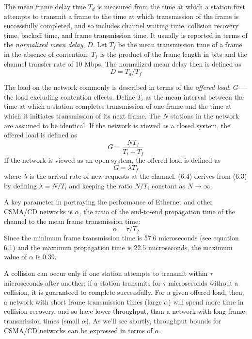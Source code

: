 The mean frame delay time $T_d$ is measured from the time at which a station first attempts to transmit a frame to the time at which transmission of the frame is successfully completed, and so includes channel waiting time, collision recovery time, backoff time, and frame transmission time. It usually is reported in terms of the \emph{normalized mean delay}, $D$. Let $T_f$ be the mean transmission time of a frame in the absence of contention: $T_f$ is the product of the frame length in bits and the channel transfer rate of 10 Mbps. The normalized mean delay then is defined as
\begin{equation} D=T_d/T_f \end{equation}

The load on the network commonly is described in terms of the \emph{offered load}, $G$ --- the load excluding contention effects. Define $T_i$ as the mean interval between the time at which a station completes transmission of one frame and the time at which it initiates transmission of its next frame. The $N$ stations in the network are assumed to be identical. If the network is viewed as a closed system, the offered load is defined as
\begin{equation} G=\frac{NT_f}{T_i+T_f} \end{equation}
If the network is viewed as an open system, the offered load is defined as
\begin{equation} G=\lambda T_f \end{equation}
where $\lambda$ is the arrival rate of new requests at the channel. (6.4) derives from (6.3) by defining $\lambda=N/T_i$ and keeping the ratio $N/T_i$ constant as $N\to\infty$.

A key parameter in portraying the performance of Ethernet and other CSMA/CD networks is $\alpha$, the ratio of the end-to-end propagation time of the channel to the mean frame transmission time:
\begin{equation} \alpha=\tau/T_f \end{equation}
Since the minimum frame transmission time is 57.6 microseconds (see equation 6.1) and the maximum propagation time is 22.5 microseconds, the maximum value of $\alpha$ is 0.39.

A collision can occur only if one station attempts to transmit within $\tau$ microseconds after another; if a station transmits for $\tau$ microseconds without a collision, it is guaranteed to complete successfully. For a given offered load, then, a network with short frame transmission times (large $\alpha$) will spend more time in collision recovery, and so have lower throughput, than a network with long frame transmission times (small $\alpha$). As we'll see shortly, throughput bounds for CSMA/CD networks can be expressed in terms of $\alpha$.

